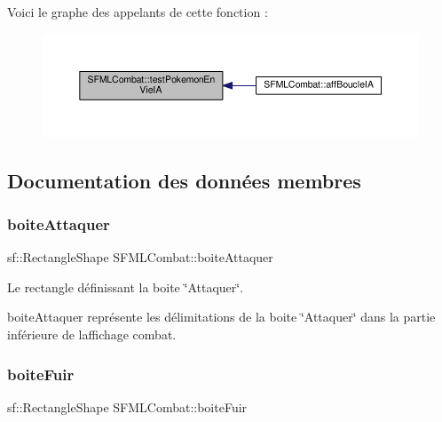 Voici le graphe des appelants de cette fonction \+:\nopagebreak
\begin{figure}[H]
\begin{center}
\leavevmode
\includegraphics[width=350pt]{class_s_f_m_l_combat_a97bf8a2d3300663aacbb8899bbbf3472_icgraph}
\end{center}
\end{figure}


\subsection{Documentation des données membres}
\mbox{\label{class_s_f_m_l_combat_a3dbd6e3e3626b934d91feeecfdc75f2f}} 
\subsubsection{\texorpdfstring{boite\+Attaquer}{boiteAttaquer}}
{\footnotesize\ttfamily sf\+::\+Rectangle\+Shape S\+F\+M\+L\+Combat\+::boite\+Attaquer\hspace{0.3cm}{\ttfamily [private]}}



Le rectangle définissant la boite \char`\"{}\+Attaquer\char`\"{}. 

boite\+Attaquer représente les délimitations de la boite \char`\"{}\+Attaquer\char`\"{} dans la partie inférieure de l\textquotesingle{}affichage combat. \mbox{\label{class_s_f_m_l_combat_a0a9270612142eaa1406152265ba839b2}} 
\subsubsection{\texorpdfstring{boite\+Fuir}{boiteFuir}}
{\footnotesize\ttfamily sf\+::\+Rectangle\+Shape S\+F\+M\+L\+Combat\+::boite\+Fuir\hspace{0.3cm}{\ttfamily [private]}}



